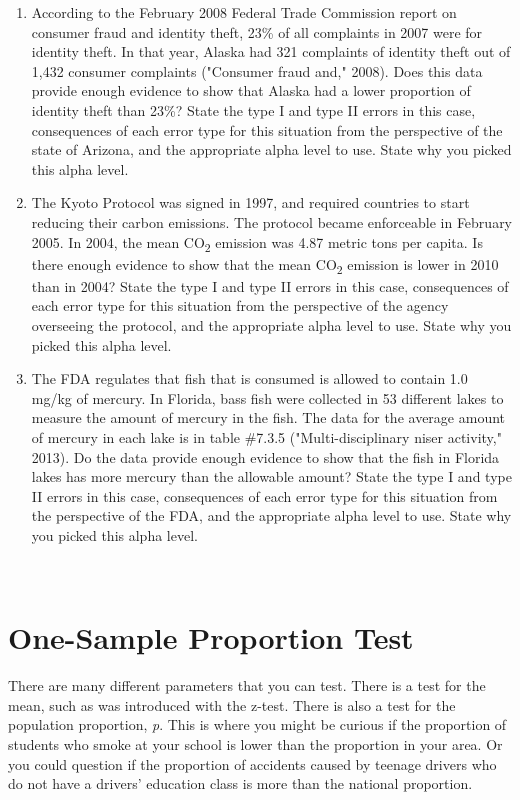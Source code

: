 \documentclass[]{book}
\begin{document}
\begin{enumerate}
\item
  According to the February 2008 Federal Trade Commission report on consumer fraud and identity theft, 23\% of all complaints in 2007 were for identity theft. In that year, Alaska had 321 complaints of identity theft out of 1,432 consumer complaints ("Consumer fraud and," 2008). Does this data provide enough evidence to show that Alaska had a lower proportion of identity theft than 23\%? State the type I and type II errors in this case, consequences of each error type for this situation from the perspective of the state of Arizona, and the appropriate alpha level to use. State why you picked this alpha level.
\item
  The Kyoto Protocol was signed in 1997, and required countries to start reducing their carbon emissions. The protocol became enforceable in February 2005. In 2004, the mean CO\textsubscript{2} emission was 4.87 metric tons per capita. Is there enough evidence to show that the mean CO\textsubscript{2} emission is lower in 2010 than in 2004? State the type I and type II errors in this case, consequences of each error type for this situation from the perspective of the agency overseeing the protocol, and the appropriate alpha level to use. State why you picked this alpha level.
\item
  The FDA regulates that fish that is consumed is allowed to contain 1.0 mg/kg of mercury. In Florida, bass fish were collected in 53 different lakes to measure the amount of mercury in the fish. The data for the average amount of mercury in each lake is in table \#7.3.5 ("Multi-disciplinary niser activity," 2013). Do the data provide enough evidence to show that the fish in Florida lakes has more mercury than the allowable amount? State the type I and type II errors in this case, consequences of each error type for this situation from the perspective of the FDA, and the appropriate alpha level to use. State why you picked this alpha level.
\end{enumerate}

\textbf{\\
}

\hypertarget{one-sample-proportion-test}{%
\section{One-Sample Proportion Test}\label{one-sample-proportion-test}}

There are many different parameters that you can test. There is a test for the mean, such as was introduced with the z-test. There is also a test for the population proportion, \emph{p}. This is where you might be curious if the proportion of students who smoke at your school is lower than the proportion in your area. Or you could question if the proportion of accidents caused by teenage drivers who do not have a drivers' education class is more than the national proportion.
\end{document}
